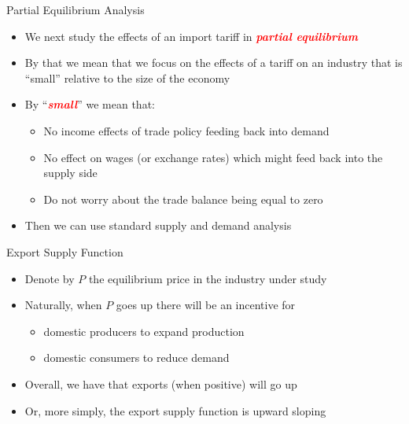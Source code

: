 \documentclass[10pt,hyperref={CJKbookmarks=true},xcolor=dvipsnames,aspectratio=169]{beamer}
\begin{document}
\begin{frame}{Partial Equilibrium Analysis}

\begin{itemize}
\item We next study the effects of an import tariff in \textbf{\textcolor{red}{\emph{partial
equilibrium}}} 
\item By that we mean that we focus on the effects of a tariff on an industry
that is “small” relative to the size of the economy 
\item By “\textbf{\textcolor{red}{\emph{small}}}” we mean that: 

\begin{itemize}
\item No income effects of trade policy feeding back into demand 
\item No effect on wages (or exchange rates) which might feed back into
the supply side 
\item Do not worry about the trade balance being equal to zero 
\end{itemize}
\item Then we can use standard supply and demand analysis
\end{itemize}
\end{frame}

\begin{frame}{Export Supply Function}

\begin{itemize}
\item Denote by $P$ the equilibrium price in the industry under study 
\item Naturally, when $P$ goes up there will be an incentive for

\begin{itemize}
\item domestic producers to expand production 
\item domestic consumers to reduce demand 
\end{itemize}
\item Overall, we have that exports (when positive) will go up 
\item Or, more simply, the export supply function is upward sloping
\end{itemize}
\end{frame}
\end{document}

